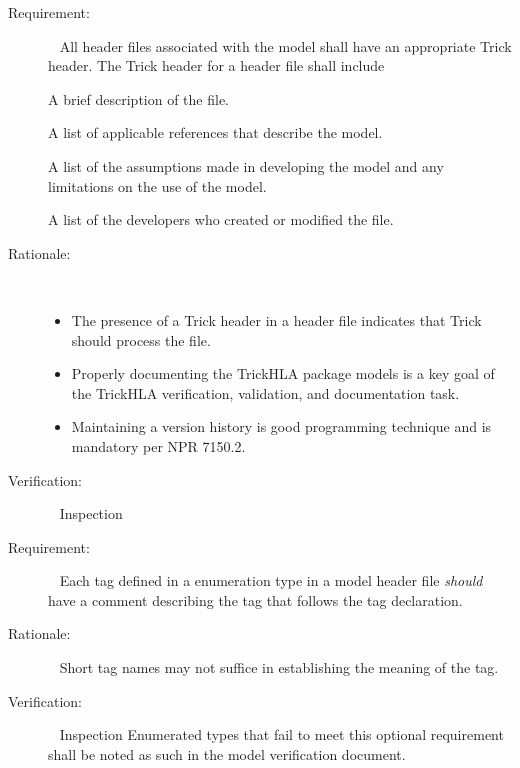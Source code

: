 \documentclass[twoside,11pt,titlepage]{report}
\begin{document}
\label{reqt:h_trick_header}
\begin{description}
  \item[Requirement:]\ \newline
    All header files associated with the model shall have an appropriate
    Trick header. The Trick header for a header file shall include

    \label{reqt:h_trick_header_purpose}
      A brief description of the file.

    \label{reqt:h_trick_header_refs}
      A list of applicable references that describe the model.

    \label{reqt:h_trick_header_assum}
      A list of the assumptions made in developing the model and
      any limitations on the use of the model.

    \label{reqt:h_trick_header_prog}
      A list of the developers who created or modified the file.

  \item[Rationale:]\ \\[-20pt]
    \begin{itemize}
      \item The presence of a Trick header in a header file
        indicates that Trick should process the file.
      \item Properly documenting the TrickHLA package models
        is a key goal of the TrickHLA verification,
        validation, and documentation task.
      \item Maintaining a version history is good programming
        technique and is mandatory per NPR 7150.2.
    \end{itemize}

  \item[Verification:]\ \newline
    Inspection
\end{description}

\label{reqt:enum_trick_comments}
\begin{description}
  \item[Requirement:]\ \newline
    Each tag defined in a enumeration type in a model header
    file {\em should} have a comment describing the tag that follows
    the tag declaration.

  \item[Rationale:]\ \newline
    Short tag names may not suffice in establishing
    the meaning of the tag.

  \item[Verification:]\ \newline
    Inspection \newline
    Enumerated types that fail to meet this optional requirement
    shall be noted as such in the model verification document.
\end{description}
\end{document}

